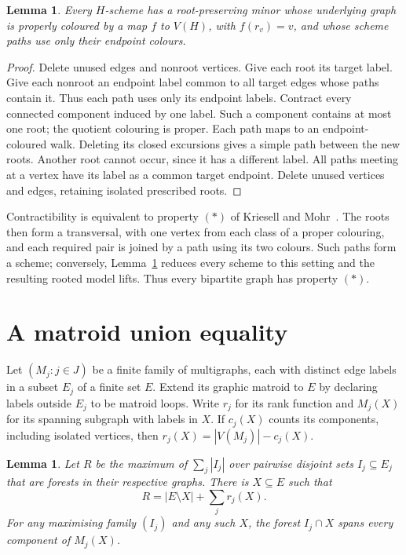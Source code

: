 \documentclass[11pt]{amsart}
\newtheorem{lemma}[theorem]{Lemma}
\begin{document}
\begin{lemma}\label{lem:normalization}
Every $H$-scheme has a root-preserving minor whose underlying graph is
properly coloured by a map $f$ to $V(H)$, with $f(r_v)=v$, and whose
scheme paths use only their endpoint colours.
\end{lemma}

\begin{proof}
Delete unused edges and nonroot vertices. Give each root its target
label. Give each nonroot an endpoint label common to all target edges
whose paths contain it. Thus each path uses only its endpoint labels.
Contract every connected component induced by one label. Such a component
contains at most one root; the quotient colouring is proper. Each path
maps to an endpoint-coloured walk. Deleting its closed excursions gives
a simple path between the new roots. Another root cannot occur,
since it has a different label. All paths meeting at a vertex have its
label as a common target endpoint. Delete unused vertices and edges,
retaining isolated prescribed roots.
\end{proof}

Contractibility is equivalent to property $(*)$ of Kriesell and
Mohr~\cite[Definition 1]{KM}. The roots then form a transversal, with
one vertex from each class of a proper colouring, and each required
pair is joined by a path using its two colours. Such paths form a scheme; conversely,
Lemma~\ref{lem:normalization} reduces every scheme to this setting and
the resulting rooted model lifts. Thus every bipartite graph has
property $(*)$.

\section{A matroid union equality}

Let $(M_j:j\in J)$ be a finite family of multigraphs, each with distinct
edge labels in a subset $E_j$ of a finite set $E$. Extend its graphic
matroid to $E$ by declaring labels outside $E_j$ to be matroid loops.
Write $r_j$ for its rank function and $M_j(X)$ for its spanning subgraph
with labels in $X$. If $c_j(X)$ counts its components, including isolated
vertices, then $r_j(X)=|V(M_j)|-c_j(X)$.

\begin{lemma}\label{lem:union}
Let $R$ be the maximum of $\sum_j|I_j|$ over pairwise disjoint sets
$I_j\subseteq E_j$ that are forests in their respective graphs.
There is $X\subseteq E$ such that
\begin{equation}\label{eq:union}
 R=|E\setminus X|+\sum_jr_j(X).
\end{equation}
For any maximising family $(I_j)$ and any such $X$, the forest
$I_j\cap X$ spans every component of $M_j(X)$.
\end{lemma}
\end{document}

